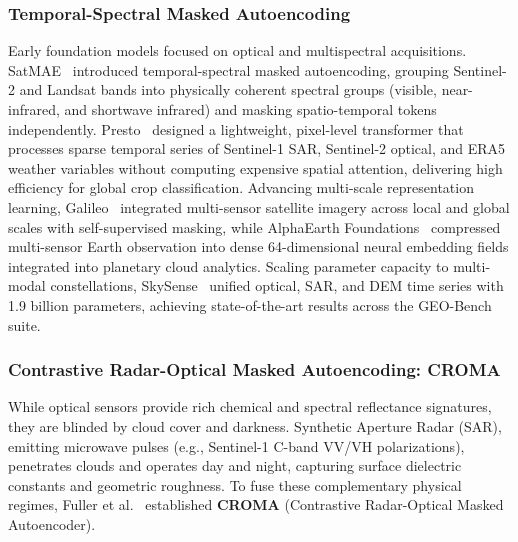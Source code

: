 \subsubsection{Temporal-Spectral Masked Autoencoding}
Early foundation models focused on optical and multispectral acquisitions. SatMAE~\cite{cong2022satmae} introduced temporal-spectral masked autoencoding, grouping Sentinel-2 and Landsat bands into physically coherent spectral groups (visible, near-infrared, and shortwave infrared) and masking spatio-temporal tokens independently. Presto~\cite{tseng2023presto} designed a lightweight, pixel-level transformer that processes sparse temporal series of Sentinel-1 SAR, Sentinel-2 optical, and ERA5 weather variables without computing expensive spatial attention, delivering high efficiency for global crop classification. Advancing multi-scale representation learning, Galileo~\cite{tseng2025galileo} integrated multi-sensor satellite imagery across local and global scales with self-supervised masking, while AlphaEarth Foundations~\cite{brown2025alphaearth} compressed multi-sensor Earth observation into dense 64-dimensional neural embedding fields integrated into planetary cloud analytics. Scaling parameter capacity to multi-modal constellations, SkySense~\cite{guo2024skysense} unified optical, SAR, and DEM time series with 1.9 billion parameters, achieving state-of-the-art results across the GEO-Bench~\cite{lacoste2023geobench} suite.

\subsubsection{Contrastive Radar-Optical Masked Autoencoding: CROMA}
While optical sensors provide rich chemical and spectral reflectance signatures, they are blinded by cloud cover and darkness. Synthetic Aperture Radar (SAR), emitting microwave pulses (e.g., Sentinel-1 C-band VV/VH polarizations), penetrates clouds and operates day and night, capturing surface dielectric constants and geometric roughness. To fuse these complementary physical regimes, Fuller et al.~\cite{fuller2023croma} established \textbf{CROMA} (Contrastive Radar-Optical Masked Autoencoder).

